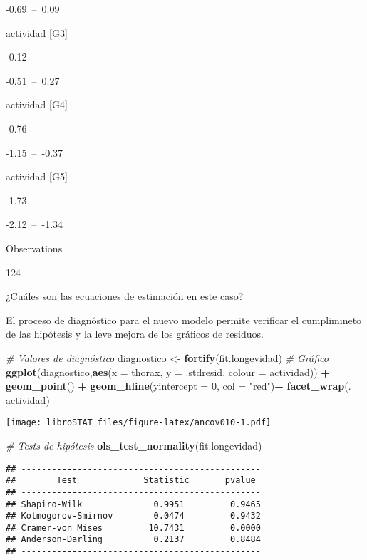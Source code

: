 \documentclass[
]{book}
\newenvironment{Shaded}{\begin{snugshade}}{\end{snugshade}}
\newcommand{\CommentTok}[1]{\textcolor[rgb]{0.56,0.35,0.01}{\textit{#1}}}
\newcommand{\DataTypeTok}[1]{\textcolor[rgb]{0.13,0.29,0.53}{#1}}
\newcommand{\DecValTok}[1]{\textcolor[rgb]{0.00,0.00,0.81}{#1}}
\newcommand{\KeywordTok}[1]{\textcolor[rgb]{0.13,0.29,0.53}{\textbf{#1}}}
\newcommand{\NormalTok}[1]{#1}
\newcommand{\OperatorTok}[1]{\textcolor[rgb]{0.81,0.36,0.00}{\textbf{#1}}}
\newcommand{\StringTok}[1]{\textcolor[rgb]{0.31,0.60,0.02}{#1}}
\theoremstyle{definition}
\theoremstyle{definition}
\theoremstyle{definition}
\theoremstyle{remark}
\begin{document}
-0.69~--~0.09

actividad {[}G3{]}

-0.12

-0.51~--~0.27

actividad {[}G4{]}

-0.76

-1.15~--~-0.37

actividad {[}G5{]}

-1.73

-2.12~--~-1.34

Observations

124

¿Cuáles son las ecuaciones de estimación en este caso?

El proceso de diagnóstico para el nuevo modelo permite verificar el cumplimineto de las hipótesis y la leve mejora de los gráficos de residuos.

\begin{Shaded}
\begin{Highlighting}[]
\CommentTok{# Valores de diagnóstico}
\NormalTok{diagnostico <-}\StringTok{ }\KeywordTok{fortify}\NormalTok{(fit.longevidad)}
\CommentTok{# Gráfico}
\KeywordTok{ggplot}\NormalTok{(diagnostico,}\KeywordTok{aes}\NormalTok{(}\DataTypeTok{x =}\NormalTok{ thorax, }\DataTypeTok{y =}\NormalTok{ .stdresid, }\DataTypeTok{colour =}\NormalTok{ actividad)) }\OperatorTok{+}\StringTok{ }
\StringTok{   }\KeywordTok{geom_point}\NormalTok{() }\OperatorTok{+}
\StringTok{   }\KeywordTok{geom_hline}\NormalTok{(}\DataTypeTok{yintercept =} \DecValTok{0}\NormalTok{, }\DataTypeTok{col =} \StringTok{"red"}\NormalTok{)}\OperatorTok{+}
\StringTok{   }\KeywordTok{facet_wrap}\NormalTok{(. }\OperatorTok{~}\StringTok{ }\NormalTok{actividad)}
\end{Highlighting}
\end{Shaded}

\texttt{[image: libroSTAT\_files/figure-latex/ancov010-1.pdf]}

\begin{Shaded}
\begin{Highlighting}[]
\CommentTok{# Tests de hipótesis}
\KeywordTok{ols_test_normality}\NormalTok{(fit.longevidad)}
\end{Highlighting}
\end{Shaded}

\begin{verbatim}
## -----------------------------------------------
##        Test             Statistic       pvalue  
## -----------------------------------------------
## Shapiro-Wilk              0.9951         0.9465 
## Kolmogorov-Smirnov        0.0474         0.9432 
## Cramer-von Mises         10.7431         0.0000 
## Anderson-Darling          0.2137         0.8484 
## -----------------------------------------------
\end{verbatim}
\end{document}
